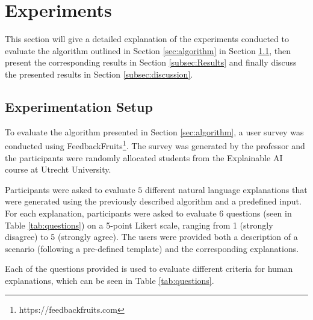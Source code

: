 \documentclass[sigconf,nonacm]{acmart}
\begin{document}
\section{Experiments} \label{subsec:experiments}
This section will give a detailed explanation of the experiments conducted to evaluate the algorithm outlined in Section \ref{sec:algorithm} in Section \ref{subsec:Experimentation}, then present the corresponding results in Section \ref{subsec:Results} and finally discuss the presented results in Section \ref{subsec:discussion}.

\subsection{Experimentation Setup} \label{subsec:Experimentation}

To evaluate the algorithm presented in Section \ref{sec:algorithm}, a user survey was conducted using FeedbackFruits\footnote{https://feedbackfruits.com}. The survey was generated by the professor and the participants were randomly allocated students from the Explainable AI course at Utrecht University.

Participants were asked to evaluate $5$ different natural language explanations that were generated using the previously described algorithm and a predefined input. For each explanation, participants were asked to evaluate 6 questions (seen in Table \ref{tab:questions}) on a 5-point Likert scale, ranging from 1 (strongly disagree) to 5 (strongly agree). The users were provided both a description of a scenario (following a pre-defined template) and the corresponding explanations.

Each of the questions provided is used to evaluate different criteria for human explanations, which can be seen in Table \ref{tab:questions}.

\end{document}
